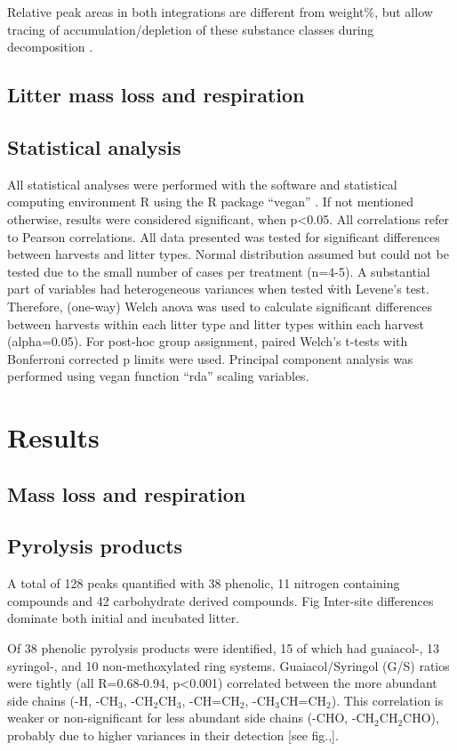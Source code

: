 \documentclass[preprint,review,12pt]{elsarticle}
\begin{document}
Relative peak areas in both integrations are different from weight\%, but allow tracing of accumulation/depletion of these substance classes during decomposition \citep{Schellekens2009}. 

\subsection{Litter mass loss and respiration}

\subsection{Statistical analysis}
All statistical analyses were performed with the software and statistical computing environment R using the R package ``vegan'' \citep{Oksanen2011}. If not mentioned otherwise, results were considered significant, when p\textless 0.05. All correlations refer to Pearson correlations.
All data presented was tested for significant differences between harvests and litter types. Normal distribution assumed but could not be tested due to the small number of cases per treatment (n=4-5). A substantial part of variables had heterogeneous variances when tested ẃith Levene's test. Therefore, (one-way) Welch anova was used to calculate significant differences between harvests within each litter type and litter types within each harvest (alpha=0.05). For post-hoc group assignment, paired Welch's t-tests with Bonferroni corrected p limits were used. Principal component analysis was performed using vegan function ``rda'' scaling variables.

\section{Results}

\subsection{Mass loss and respiration}

\subsection{Pyrolysis products}

A total of 128 peaks quantified with 38 phenolic, 11 nitrogen containing compounds and 42 carbohydrate derived compounds. Fig Inter-site differences dominate both initial and incubated litter.

Of 38 phenolic pyrolysis products were identified, 15 of which had guaiacol-, 13 syringol-, and 10 non-methoxylated ring systems. Guaiacol/Syringol (G/S) ratios were tightly (all R=0.68-0.94, p<0.001) correlated between the more abundant side chains (-H, -CH$_3$, -CH$_2$CH$_3$, -CH=CH$_2$, -CH$_3$CH=CH$_2$). This correlation is weaker or non-significant for less abundant side chains (-CHO, -CH$_2$CH$_2$CHO), probably due to higher variances in their detection [see fig.,]. 
\end{document}

